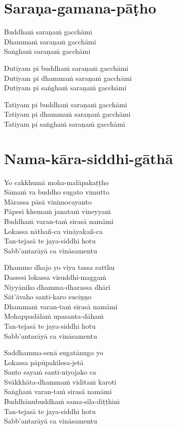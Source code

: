 \chapter{Saraṇa-gamana-pāṭho}%


\begin{paritta}
Buddhaṁ saraṇaṁ gacchāmi\\
Dhammaṁ saraṇaṁ gacchāmi\\
Saṅghaṁ saraṇaṁ gacchāmi

Dutiyam pi buddhaṁ saraṇaṁ gacchāmi\\
Dutiyam pi dhammaṁ saraṇaṁ gacchāmi\\
Dutiyam pi saṅghaṁ saraṇaṁ gacchāmi

Tatiyam pi buddhaṁ saraṇaṁ gacchāmi\\
Tatiyam pi dhammaṁ saraṇaṁ gacchāmi\\
Tatiyam pi saṅghaṁ saraṇaṁ gacchāmi
\end{paritta}

\clearpage

\chapter{Nama-kāra-siddhi-gāthā}%


\begin{paritta}
Yo cakkhumā moha-malāpakaṭṭho\\
Sāmaṁ va buddho sugato vimutto\\
Mārassa pāsā vinimocayanto\\
Pāpesi khemaṁ janataṁ vineyyaṁ\\
Buddhaṁ varan-taṁ sirasā namāmi\\
Lokassa nāthañ-ca vināyakañ-ca\\
Tan-tejasā te jaya-siddhi hotu\\
Sabb'antarāyā ca vināsamentu

Dhammo dhajo yo viya tassa satthu\\
Dassesi lokassa visuddhi-maggaṁ\\
Niyyāniko dhamma-dharassa dhārī\\
Sāt'āvaho santi-karo suciṇṇo\\
Dhammaṁ varan-taṁ sirasā namāmi\\
Mohappadālaṁ upasanta-dāhaṁ\\
Tan-tejasā te jaya-siddhi hotu\\
Sabb'antarāyā ca vināsamentu

Saddhamma-senā sugatānugo yo\\
Lokassa pāpūpakilesa-jetā\\
Santo sayaṁ santi-niyojako ca\\
Svākkhāta-dhammaṁ viditaṁ karoti\\
Saṅghaṁ varan-taṁ sirasā namāmi\\
Buddhānubuddhaṁ sama-sīla-diṭṭhiṁ\\
Tan-tejasā te jaya-siddhi hotu\\
Sabb'antarāyā ca vināsamentu
\end{paritta}

